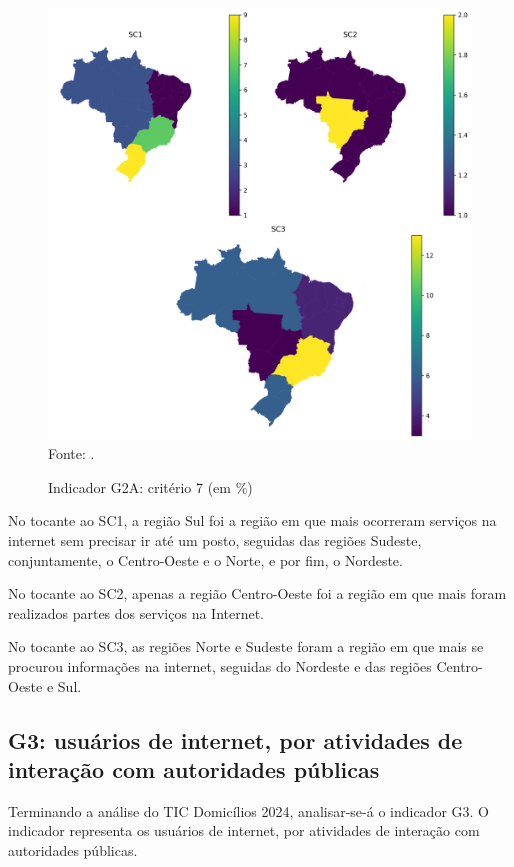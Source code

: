 \begin{figure}[H]
	\centering
	\caption{Indicador G2A: critério 7 (em \%)}
	\includegraphics[width=1\linewidth]{figuras/mapa_coropletico_tic_domicilios_2024_g2a_7.png}
	\label{fig:mapa_coropletico_tic_domicilios_2024_g2a_7}
	\footnotesize{Fonte: \cite{tic_domicilios_2024_g2a}.}
\end{figure}

No tocante ao SC1, a região Sul foi a região em que mais ocorreram serviços na internet sem precisar ir até um posto, seguidas das regiões Sudeste, conjuntamente, o Centro-Oeste e o Norte, e por fim, o Nordeste.

No tocante ao SC2, apenas a região Centro-Oeste foi a região em que mais foram realizados partes dos serviços na Internet.

No tocante ao SC3, as regiões Norte e Sudeste foram a região em que mais se procurou informações na internet, seguidas do Nordeste e das regiões Centro-Oeste e Sul.

\subsection{G3: usuários de internet, por atividades de interação com autoridades públicas}

Terminando a análise do TIC Domicílios 2024, analisar-se-á o indicador G3. O indicador representa os usuários de internet, por atividades de interação com autoridades públicas.

